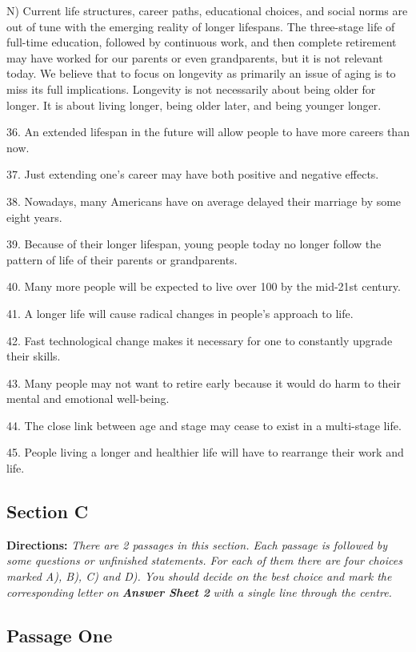 \documentclass[UTF8,11pt]{ctexart}
\begin{document}
N) Current life structures, career paths, educational choices, and social norms are out of tune with the emerging reality of longer lifespans. The three-stage life of full-time education, followed by continuous work, and then complete retirement may have worked for our parents or even grandparents, but it is not relevant today. We believe that to focus on longevity as primarily an issue of aging is to miss its full implications. Longevity is not necessarily about being older for longer. It is about living longer, being older later, and being younger longer.


36. An extended lifespan in the future will allow people to have more careers than now.


37. Just extending one’s career may have both positive and negative effects.


38. Nowadays, many Americans have on average delayed their marriage by some eight years.


39. Because of their longer lifespan, young people today no longer follow the pattern of life of their parents or grandparents.


40. Many more people will be expected to live over 100 by the mid-21st century.


41. A longer life will cause radical changes in people’s approach to life.


42. Fast technological change makes it necessary for one to constantly upgrade their skills.


43. Many people may not want to retire early because it would do harm to their mental and emotional well-being.


44. The close link between age and stage may cease to exist in a multi-stage life.


45. People living a longer and healthier life will have to rearrange their work and life.


\subsection*{\textbf{Section C}}


\textbf{Directions:}\textit{ There are 2 passages in this section. Each passage is followed by some questions or unfinished} \textit{statements. For each of them there are four choices marked A), B), C) and D). You should decide on the best} \textit{choice and mark the corresponding letter on}\textbf{\textit{ Answer Sheet 2}}\textit{ with a single line through the centre.}


\subsection*{\textbf{Passage One}}
\end{document}
